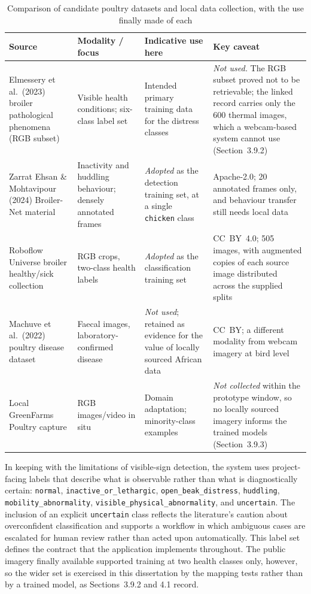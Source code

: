 \documentclass[12pt,a4paper]{report}
\begin{document}
\begin{table}[tbp]
\caption{Comparison of candidate poultry datasets and local data collection, with the use finally made of each}
\label{tab:datasets}
\centering
\small
\setlength{\tabcolsep}{4pt}
\begin{tabularx}{\textwidth}{|Y|Y|Y|Y|}
\hline
{}
\textbf{Source} & \textbf{Modality / focus} & \textbf{Indicative use here} & \textbf{Key caveat} \\
\hline
Elmessery et al.\ (2023) broiler pathological phenomena (RGB subset) & Visible health conditions; six-class label set & Intended primary training data for the distress classes & \emph{Not used.} The RGB subset proved not to be retrievable; the linked record carries only the 600 thermal images, which a webcam-based system cannot use (Section~3.9.2) \\
\hline
Zarrat Ehsan \& Mohtavipour (2024) Broiler-Net material & Inactivity and huddling behaviour; densely annotated frames & \emph{Adopted} as the detection training set, at a single \texttt{chicken} class & Apache-2.0; 20 annotated frames only, and behaviour transfer still needs local data \\
\hline
Roboflow Universe broiler healthy/sick collection & RGB crops, two-class health labels & \emph{Adopted} as the classification training set & CC~BY~4.0; 505 images, with augmented copies of each source image distributed across the supplied splits \\
\hline
Machuve et al.\ (2022) poultry disease dataset & Faecal images, laboratory-confirmed disease & \emph{Not used}; retained as evidence for the value of locally sourced African data & CC~BY; a different modality from webcam imagery at bird level \\
\hline
Local GreenFarms Poultry capture & RGB images/video in situ & Domain adaptation; minority-class examples & \emph{Not collected} within the prototype window, so no locally sourced imagery informs the trained models (Section~3.9.3) \\
\hline
\end{tabularx}
\end{table}

In keeping with the limitations of visible-sign detection, the system uses project-facing labels that describe what is observable rather than what is diagnostically certain: \texttt{normal}, \texttt{inactive\_or\_lethargic}, \texttt{open\_beak\_distress}, \texttt{huddling}, \texttt{mobility\_abnormality}, \texttt{visible\_physical\_abnormality}, and \texttt{uncertain}. The inclusion of an explicit \texttt{uncertain} class reflects the literature's caution about overconfident classification and supports a workflow in which ambiguous cases are escalated for human review rather than acted upon automatically. This label set defines the contract that the application implements throughout. The public imagery finally available supported training at two health classes only, however, so the wider set is exercised in this dissertation by the mapping tests rather than by a trained model, as Sections~3.9.2 and 4.1 record.
\end{document}
